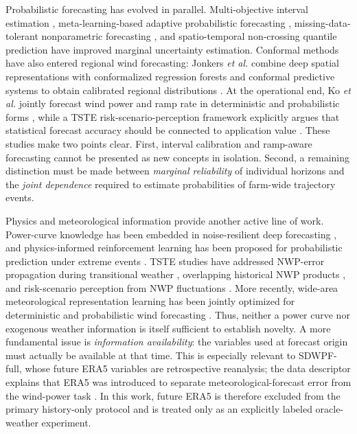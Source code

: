\documentclass[journal]{IEEEtran}
\newcommand{\1}{\mathbb{I}}
\begin{document}
Probabilistic forecasting has evolved in parallel. Multi-objective interval estimation \cite{chen2024interval}, meta-learning-based adaptive probabilistic forecasting \cite{meng2024meta}, missing-data-tolerant nonparametric forecasting \cite{meng2026missing}, and spatio-temporal non-crossing quantile prediction \cite{chen2025noncrossing} have improved marginal uncertainty estimation. Conformal methods have also entered regional wind forecasting: Jonkers \emph{et al.} combine deep spatial representations with conformalized regression forests and conformal predictive systems to obtain calibrated regional distributions \cite{jonkers2024conformal}. At the operational end, Ko \emph{et al.} jointly forecast wind power and ramp rate in deterministic and probabilistic forms \cite{ko2026ramp}, while a TSTE risk-scenario-perception framework explicitly argues that statistical forecast accuracy should be connected to application value \cite{yang2025risk}. These studies make two points clear. First, interval calibration and ramp-aware forecasting cannot be presented as new concepts in isolation. Second, a remaining distinction must be made between \emph{marginal reliability} of individual horizons and the \emph{joint dependence} required to estimate probabilities of farm-wide trajectory events.

Physics and meteorological information provide another active line of work. Power-curve knowledge has been embedded in noise-resilient deep forecasting \cite{gao2025tgdpF}, and physics-informed reinforcement learning has been proposed for probabilistic prediction under extreme events \cite{liu2024physicsrl}. TSTE studies have addressed NWP-error propagation during transitional weather \cite{zhang2026transitional}, overlapping historical NWP products \cite{zhao2025nwp}, and risk-scenario perception from NWP fluctuations \cite{yang2025risk}. More recently, wide-area meteorological representation learning has been jointly optimized for deterministic and probabilistic wind forecasting \cite{cao2026joint}. Thus, neither a power curve nor exogenous weather information is itself sufficient to establish novelty. A more fundamental issue is \emph{information availability}: the variables used at forecast origin must actually be available at that time. This is especially relevant to SDWPF-full, whose future ERA5 variables are retrospective reanalysis; the data descriptor explains that ERA5 was introduced to separate meteorological-forecast error from the wind-power task \cite{zhou2024sdwpf}. In this work, future ERA5 is therefore excluded from the primary history-only protocol and is treated only as an explicitly labeled oracle-weather experiment.
\end{document}
